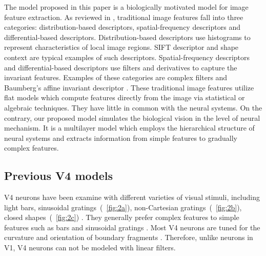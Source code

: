 \documentclass[10pt]{article}
\begin{document}
The model proposed in this paper is a biologically motivated model for image feature extraction.
As reviewed in \cite{mikolajczyk2005}, traditional image features fall into three categories: 
distribution-based descriptors, spatial-frequency descriptors and differential-based descriptors.
Distribution-based descriptors use histograms to represent characteristics of local image regions.
SIFT descriptor \cite{lowe1999} and shape context \cite{belongie2002} are typical examples of such descriptors.
Spatial-frequency descriptors and differential-based descriptors use filters and derivatives to capture the invariant features. 
Examples of these categories are complex filters \cite{schaffalitzky2002} and Baumberg's affine invariant descriptor \cite{baumberg2000}.
These traditional image features utilize flat models which compute features directly from the image via statistical or algebraic techniques. 
They have little in common with the neural systems.
On the contrary, our proposed model simulates the biological vision in the level of neural mechanism.
It is a multilayer model which employs the hierarchical structure of neural systems and extracts information from simple features to gradually complex features. 

\subsection{Previous V4 models}

V4 neurons have been examine with different varieties of visual stimuli, including light bars, sinusoidal gratings~(\figurename~\ref{fig:2a}),
non-Cartesian gratings~(\figurename~\ref{fig:2b}), closed shapes~(\figurename~\ref{fig:2c}) \cite{desimone1987,gallant1996,pasupathy1999,pasupathy2001}.
They generally prefer complex features to simple features such as bars and sinusoidal gratings \cite{gallant1996}.
Most V4 neurons are tuned for the curvature and orientation of boundary fragments \cite{pasupathy2001}.
Therefore, unlike neurons in V1, V4 neurons can not be modeled with linear filters.
\end{document}
